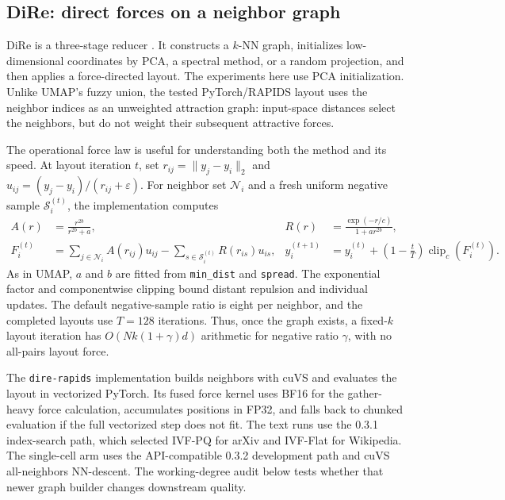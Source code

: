 \documentclass[10pt]{article}
\begin{document}
\subsection{DiRe: direct forces on a neighbor graph}

DiRe is a three-stage reducer \cite{dire,direrapids}.  It constructs a $k$-NN graph, initializes
low-dimensional coordinates by PCA, a spectral method, or a random projection, and then
applies a force-directed layout.  The experiments here use PCA initialization.  Unlike
UMAP's fuzzy union, the tested PyTorch/RAPIDS layout uses the neighbor indices as an
unweighted attraction graph: input-space distances select the neighbors, but do not
weight their subsequent attractive forces.

The operational force law is useful for understanding both the method and its speed.
At layout iteration $t$, set
$r_{ij}=\|y_j-y_i\|_2$ and
$u_{ij}=(y_j-y_i)/(r_{ij}+\varepsilon)$.
For neighbor set $\mathcal N_i$ and a fresh uniform negative sample
$\mathcal S_i^{(t)}$, the implementation computes
\begin{align}
 A(r)&=\frac{r^{2b}}{r^{2b}+a},
 &
 R(r)&=\frac{\exp(-r/c)}{1+a r^{2b}},
 \label{eq:dire-kernels}\\
 F_i^{(t)}
 &=\sum_{j\in\mathcal N_i}A(r_{ij})u_{ij}
   -\sum_{s\in\mathcal S_i^{(t)}}R(r_{is})u_{is},
 &
 y_i^{(t+1)}
 &=y_i^{(t)}
   +\left(1-\frac{t}{T}\right)\operatorname{clip}_c(F_i^{(t)}).
 \label{eq:dire-update}
\end{align}
As in UMAP, $a$ and $b$ are fitted from \texttt{min\_dist} and
\texttt{spread}.  The exponential factor and componentwise clipping bound distant
repulsion and individual updates.  The default negative-sample ratio is eight per
neighbor, and the completed layouts use $T=128$ iterations.  Thus, once the graph
exists, a fixed-$k$ layout iteration has $O(Nk(1+\gamma)d)$ arithmetic for negative
ratio $\gamma$, with no all-pairs layout force.

The \texttt{dire-rapids} implementation builds neighbors with cuVS and evaluates the
layout in vectorized PyTorch.  Its fused force kernel uses BF16 for the gather-heavy
force calculation, accumulates positions in FP32, and falls back to chunked evaluation
if the full vectorized step does not fit.  The text runs use the 0.3.1 index-search
path, which selected IVF-PQ for arXiv and IVF-Flat for Wikipedia.  The single-cell arm
uses the API-compatible 0.3.2 development path and cuVS all-neighbors NN-descent.
The working-degree audit below tests whether that newer graph builder changes downstream
quality.
\end{document}
